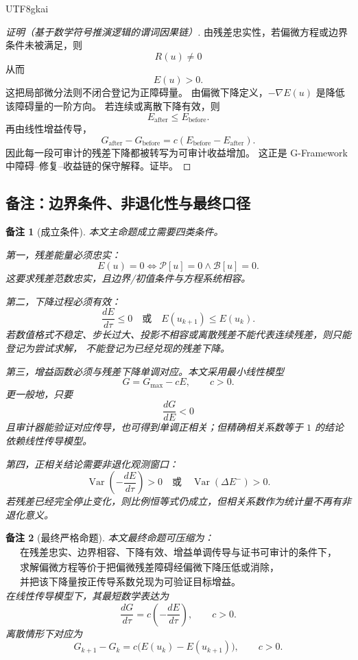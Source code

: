 \documentclass[12pt]{article}
\newtheorem{remark}{备注}[section]
\newcommand{\GFramework}{\textsf{G-Framework}}
\newcommand{\Pcal}{\mathcal P}
\newcommand{\Bcal}{\mathcal B}
\DeclareMathOperator{\Var}{Var}
\begin{document}
\begin{CJK*}{UTF8}{gkai}
\begin{proof}[证明（基于数学符号推演逻辑的谓词因果链）]
由残差忠实性，若偏微方程或边界条件未被满足，则
\[
  R(u)\ne0
\]
从而
\[
  E(u)>0.
\]
这把局部微分法则不闭合登记为正障碍量。
由偏微下降定义，\(-\nabla E(u)\) 是降低该障碍量的一阶方向。
若连续或离散下降有效，则
\[
  E_{\mathrm{after}}\le E_{\mathrm{before}}.
\]
再由线性增益传导，
\[
  G_{\mathrm{after}}-G_{\mathrm{before}}
  =
  c(E_{\mathrm{before}}-E_{\mathrm{after}}).
\]
因此每一段可审计的残差下降都被转写为可审计收益增加。
这正是 \GFramework{} 中障碍--修复--收益链的保守解释。证毕。
\end{proof}

\subsection{备注：边界条件、非退化性与最终口径}
\label{subsec:tex58-remarks}

\begin{remark}[成立条件]
本文主命题成立需要四类条件。

第一，残差能量必须忠实：
\[
  E(u)=0
  \Longleftrightarrow
  \Pcal[u]=0\wedge\Bcal[u]=0.
\]
这要求残差范数忠实，且边界/初值条件与方程系统相容。

第二，下降过程必须有效：
\[
  \frac{dE}{d\tau}\le0
  \quad\text{或}\quad
  E(u_{k+1})\le E(u_k).
\]
若数值格式不稳定、步长过大、投影不相容或离散残差不能代表连续残差，则只能登记为尝试求解，
不能登记为已经兑现的残差下降。

第三，增益函数必须与残差下降单调对应。本文采用最小线性模型
\[
  G=G_{\max}-cE,\qquad c>0.
\]
更一般地，只要
\[
  \frac{dG}{dE}<0
\]
且审计器能验证对应传导，也可得到单调正相关；但精确相关系数等于 \(1\) 的结论依赖线性传导模型。

第四，正相关结论需要非退化观测窗口：
\[
  \Var\left(-\frac{dE}{d\tau}\right)>0
  \quad\text{或}\quad
  \Var(\Delta E^{-})>0.
\]
若残差已经完全停止变化，则比例恒等式仍成立，但相关系数作为统计量不再有非退化意义。
\end{remark}

\begin{remark}[最终严格命题]
本文最终命题可压缩为：
\[
  \boxed{
  \begin{gathered}
  \text{在残差忠实、边界相容、下降有效、增益单调传导与证书可审计的条件下，}\\
  \text{求解偏微方程等价于把偏微残差障碍经偏微下降压低或消除，}\\
  \text{并把该下降量按正传导系数兑现为可验证目标增益。}
  \end{gathered}
  }
\]
在线性传导模型下，其最短数学表达为
\[
  \boxed{
  \frac{dG}{d\tau}
  =
  c\left(-\frac{dE}{d\tau}\right),
  \qquad c>0.
  }
\]
离散情形下对应为
\[
  \boxed{
  G_{k+1}-G_k
  =
  c\bigl(E(u_k)-E(u_{k+1})\bigr),
  \qquad c>0.
  }
\]
\end{remark}


\end{CJK*}
\end{document}
